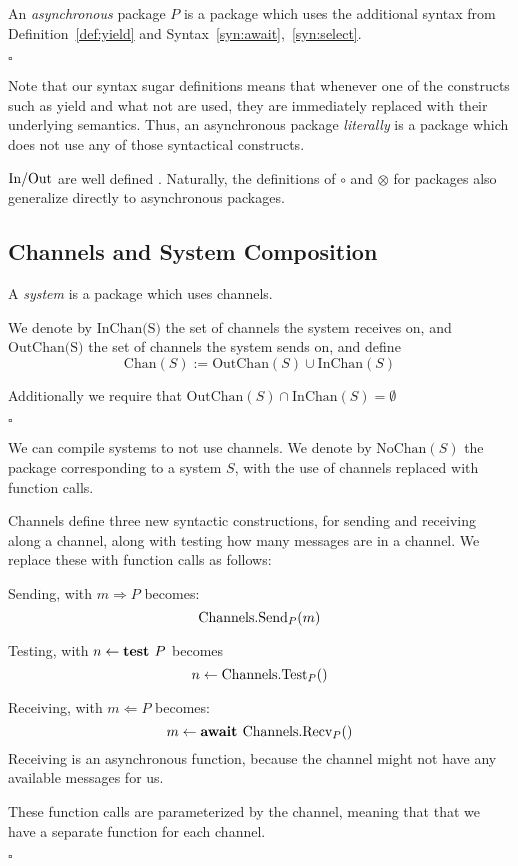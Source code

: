 \begin{definition}
  An \emph{asynchronous} package $P$ is a package which uses the additional
  syntax from Definition~\ref{def:yield} and Syntax~\ref{syn:await},~\ref{syn:select}.

  $\square$
\end{definition}

Note that our syntax sugar definitions means that whenever one of the constructs
such as yield and what not are used, they are immediately replaced with their underlying
semantics. Thus, an asynchronous package \emph{literally} is a package which 
does not use any of those syntactical constructs.

$\text{In/Out}$ are well defined .
Naturally, the definitions of $\circ$ and $\otimes$ for packages also
generalize directly to asynchronous packages.

\subsection{Channels and System Composition}


\begin{definition}[Systems]
A \emph{system} is a package which uses channels.

We denote by $\text{InChan(S)}$ the set of channels the system receives on,
and $\text{OutChan(S)}$ the set of channels the system sends on,
and define
$$
\text{Chan}(S) := \text{OutChan}(S) \cup \text{InChan}(S)
$$

Additionally we require that $\text{OutChan}(S) \cap \text{InChan}(S) = \emptyset$

$\square$
\end{definition}

\begin{definition}
We can compile systems to not use channels.
We denote by $\text{NoChan}(S)$ the package corresponding to
a system $S$, with the use of channels replaced with function calls.

Channels define three new syntactic constructions, for sending and receiving
along a channel, along with testing how many messages are in a channel.
We replace these with function calls as follows:


Sending, with $m \Rightarrow P$ becomes:
$$
\text{Channels}.\text{Send}_P(m)
$$

Testing, with $n \gets \textbf{test } P$ becomes
$$
n \gets \text{Channels}.\text{Test}_P()
$$

Receiving, with $m \Leftarrow P$ becomes:
$$
m \gets \textbf{await } \text{Channels}.\text{Recv}_P()
$$
Receiving is an asynchronous function, because the channel might not have
any available messages for us.

These function calls are parameterized by the channel, meaning
that that we have a separate function for each channel.

$\square$
\end{definition}

